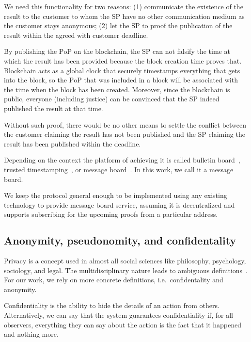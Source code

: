 \documentclass{ieeeaccess}
\begin{document}
We need this functionality for two reasons: (1) communicate the existence of the result to the customer to whom the SP have no other communication medium as the customer stays anonymous; (2) let the SP to proof the publication of the result within the agreed with customer deadline. 

By publishing the $\mathrm{PoP}$ on the blockchain, the SP can not falsify the time at which the result has been provided because the block creation time proves that. Blockchain acts as a global clock that securely timestamps everything that gets into the block, so the $\mathrm{PoP}$ that was included in a block will be associated with the time when the block has been created. Moreover, since the blockchain is public, everyone (including justice) can be convinced that the SP indeed published the result at that time.

Without such proof, there would be no other means to settle the conflict between the customer claiming the result has not been published and the SP claiming the result has been published within the deadline.

Depending on the context the platform of achieving it is called bulletin board~\cite{achenbachImprovedCoercionresistantElectronic2015}, trusted timestamping~\cite{gippDecentralizedTrustedTimestamping2015}, or message board~\cite{hinarejosSolutionSecureCertified2019}. In this work, we call it a message board.

We keep the protocol general enough to be implemented using any existing technology to provide message board service, assuming it is decentralized and supports subscribing for the upcoming proofs from a particular address.

\subsection{Anonymity, pseudonomity, and confidentality}\label{sec:pseudo-anon}

Privacy is a concept used in almost all social sciences like philosophy, psychology, sociology, and legal. The multidisciplinary nature leads to ambiguous definitions~\cite{smithInformationPrivacyResearch2011}. For our work, we rely on more concrete definitions, i.e.~confidentality and anonymity.

Confidentiality is the ability to hide the details of an action from others. Alternatively, we can say that the system guarantees confidentiality if, for all observers, everything they can say about the action is the fact that it happened and nothing more.
\end{document}
